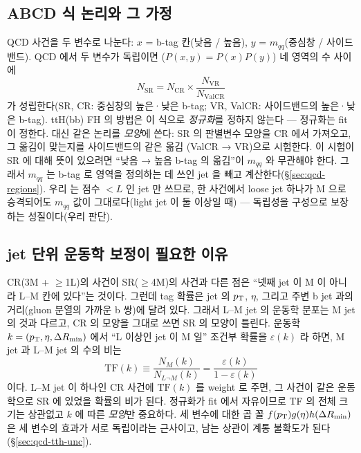\subsection{ABCD 식 논리와 그 가정}
QCD 사건을 두 변수로 나눈다: $x$ = b-tag 칸(낮음 / 높음), $y$ = $m_{qq}$(중심창 / 사이드밴드). QCD 에서 두 변수가 독립이면
($P(x,y)=P(x)P(y)$) 네 영역의 수 사이에
\begin{equation}
N_{\text{SR}}=N_{\text{CR}}\times\frac{N_{\text{VR}}}{N_{\text{ValCR}}}
\label{eq:qcd-abcd}
\end{equation}
가 성립한다(SR, CR: 중심창의 높은·낮은 b-tag; VR, ValCR: 사이드밴드의 높은·낮은 b-tag). ttH(bb) FH 의 방법은 이 식으로 \emph{정규화}를 정하지
않는다 — 정규화는 fit 이 정한다. 대신 같은 논리를 \emph{모양}에 쓴다: SR 의 판별변수 모양을 CR 에서 가져오고, 그 옮김이 맞는지를 사이드밴드의 같은 옮김
(ValCR → VR)으로 시험한다. 이 시험이 SR 에 대해 뜻이 있으려면 ``낮음 → 높음 b-tag 의 옮김''이 $m_{qq}$ 와 무관해야 한다. 그래서 $m_{qq}$ 는 b-tag 로
영역을 정의하는 데 쓰인 jet 을 빼고 계산한다(\S\ref{sec:qcd-regions}). 우리  는 점수 $<L$ 인 jet 만 쓰므로, 한 사건에서 loose jet
하나가 M 으로 승격되어도 $m_{qq}$ 값이 그대로다(light jet 이 둘 이상일 때) — 독립성을 구성으로 보장하는 성질이다(우리 판단).

\subsection{jet 단위 운동학 보정이 필요한 이유}
CR(3M + $\ge$1L)의 사건이 SR(${\ge}$4M)의 사건과 다른 점은 ``넷째 jet 이 M 이 아니라 L–M 칸에 있다''는 것이다. 그런데 tag 확률은 jet 의 $p_{\mathrm{T}}$,
$\eta$, 그리고 주변 b jet 과의 거리(gluon 분열의 가까운 b 쌍)에 달려 있다. 그래서 L–M jet 의 운동학 분포는 M jet 의 것과 다르고, CR 의 모양을 그대로
쓰면 SR 의 모양이 틀린다. 운동학 $k=(p_{\mathrm{T}},\eta,\Delta R_{\min})$ 에서 ``L 이상인 jet 이 M 일'' 조건부 확률을 $\varepsilon(k)$ 라 하면, M jet 과 L–M jet 의 수의 비는
\begin{equation}
\text{TF}(k)\equiv\frac{N_M(k)}{N_{L\neg M}(k)}=\frac{\varepsilon(k)}{1-\varepsilon(k)}
\label{eq:qcd-tfdef}
\end{equation}
이다. L–M jet 이 하나인 CR 사건에 $\text{TF}(k)$ 를 weight 로 주면, 그 사건이 같은 운동학으로 SR 에 있었을 확률의 비가 된다. 정규화가 fit 에서 자유이므로
TF 의 전체 크기는 상관없고 $k$ 에 따른 \emph{모양}만 중요하다. 세 변수에 대한 곱 꼴 $f(p_{\mathrm{T}})g(\eta)h(\Delta R_{\min})$ 은 세 변수의 효과가 서로 독립이라는 근사이고,
남는 상관이 계통 불확도가 된다(\S\ref{sec:qcd-tth-unc}).

